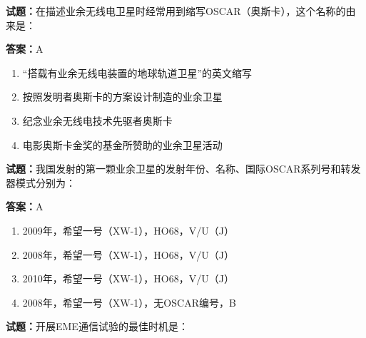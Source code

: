\documentclass{ctexbook}
\begin{document}




\vspace{1em}

\textbf{试题：}在描述业余无线电卫星时经常用到缩写OSCAR（奥斯卡），这个名称的由来是： 

\textbf{答案：}A 

\begin{enumerate}[leftmargin=3em]
  \item “搭载有业余无线电装置的地球轨道卫星”的英文缩写 

  \item 按照发明者奥斯卡的方案设计制造的业余卫星 

  \item 纪念业余无线电技术先驱者奥斯卡 

  \item 电影奥斯卡金奖的基金所赞助的业余卫星活动 

\end{enumerate}





\vspace{1em}

\textbf{试题：}我国发射的第一颗业余卫星的发射年份、名称、国际OSCAR系列号和转发器模式分别为： 

\textbf{答案：}A 

\begin{enumerate}[leftmargin=3em]
  \item 2009年，希望一号（XW-1），HO68，V/U（J） 

  \item 2008年，希望一号（XW-1），HO68，V/U（J） 

  \item 2010年，希望一号（XW-1），HO68，V/U（J） 

  \item 2008年，希望一号（XW-1），无OSCAR编号，B 

\end{enumerate}






\vspace{1em}

\textbf{试题：}开展EME通信试验的最佳时机是： 
\end{document}
